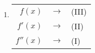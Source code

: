 \begin{multicols}{2}
\begin{enumerate}
\item \begin{minipage}{.45\textwidth}
	\begin{tabular}{rcl}
		$f(x)$ & $\longrightarrow$ & (III) \\
		$f'(x)$ & $\longrightarrow$ & (II) \\
		$f''(x)$ & $\longrightarrow$ & (I) \\
	\end{tabular}
\end{minipage}



\end{enumerate}

 \end{multicols}
